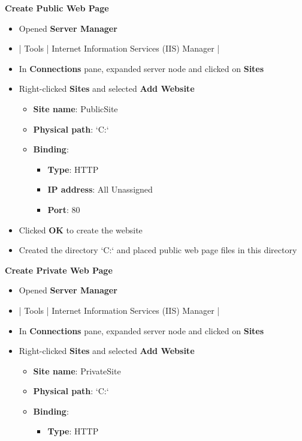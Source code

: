 \documentclass[letterpaper]{article}
\begin{document}
\begin{enumerate}
\begin{itemize}
\end{itemize}
\textbf{Create Public Web Page}
\begin{itemize}
\item Opened \textbf{\textbf{Server Manager}}
\item | Tools | Internet Information Services (IIS) Manager |
\item In \textbf{\textbf{Connections}} pane, expanded server node and clicked on \textbf{\textbf{Sites}}
\item Right-clicked \textbf{\textbf{Sites}} and selected \textbf{\textbf{Add Website}}
\begin{itemize}
\item \textbf{\textbf{Site name}}: PublicSite
\item \textbf{\textbf{Physical path}}: `C:\inetpub\wwwroot\public`
\item \textbf{\textbf{Binding}}:
\begin{itemize}
\item \textbf{\textbf{Type}}: HTTP
\item \textbf{\textbf{IP address}}: All Unassigned
\item \textbf{\textbf{Port}}: 80
\end{itemize}
\end{itemize}
\item Clicked \textbf{\textbf{OK}} to create the website
\item Created the directory `C:\inetpub\wwwroot\public` and placed public web page files in this directory
\end{itemize}
\textbf{Create Private Web Page}
\begin{itemize}
\item Opened \textbf{\textbf{Server Manager}}
\item | Tools | Internet Information Services (IIS) Manager |
\item In \textbf{\textbf{Connections}} pane, expanded server node and clicked on \textbf{\textbf{Sites}}
\item Right-clicked \textbf{\textbf{Sites}} and selected \textbf{\textbf{Add Website}}
\begin{itemize}
\item \textbf{\textbf{Site name}}: PrivateSite
\item \textbf{\textbf{Physical path}}: `C:\inetpub\wwwroot\private`
\item \textbf{\textbf{Binding}}:
\begin{itemize}
\item \textbf{\textbf{Type}}: HTTP

\end{itemize}
\end{itemize}
\end{itemize}
\end{enumerate}
\end{document}
